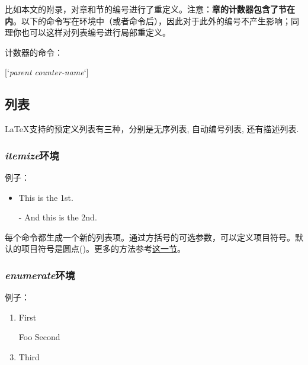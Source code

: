 比如本文的附录，对章和节的编号进行了重定义。注意：\textbf{章的计数器包含了节在内}。以下的命令写在环境中（或者命令后），因此对于此外的编号不产生影响；同理你也可以这样对列表编号进行局部重定义。
\begin{latex}
\renewcommand{\thechapter}{\Alph{chapter}}
\renewcommand{\thesection}
    {\thechapter-\arabic{section}}
\renewcommand{\thefootnote}{[\arabic{footnote}]}
\end{latex}

计数器的命令：
\begin{latex}
[`\textit{parent counter-name}`]
\end{latex}

\subsection{列表}
\LaTeX 支持的预定义列表有三种，分别是无序列表, 自动编号列表, 还有描述列表.

\subsubsection{\textit{itemize}环境}
例子：

\begin{codeshow}
\begin{itemize}
  \item This is the 1st.
  \item[-] And this is the 2nd.
\end{itemize}
\end{codeshow}

每个命令都生成一个新的列表项。通过方括号的可选参数，可以定义项目符号。默认的项目符号是圆点()。更多的方法参考\hyperref[sec:list]{这一节}。

\subsubsection{\textit{enumerate}环境}
例子：

\begin{codeshow}
\begin{enumerate}
  \item First
  \item[Foo] Second
  \item Third
\end{enumerate}
\end{codeshow}

